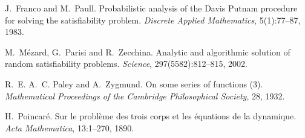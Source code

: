 
J.~Franco and M.~Paull.
\newblock Probabilistic analysis of the Davis Putnam procedure for solving the satisfiability problem.
\newblock \emph{Discrete Applied Mathematics}, 5(1):77--87, 1983.

M.~M\'ezard, G.~Parisi and R.~Zecchina.
\newblock Analytic and algorithmic solution of random satisfiability problems.
\newblock \emph{Science}, 297(5582):812--815, 2002.

R.~E. A.~C. Paley and A.~Zygmund.
\newblock On some series of functions (3).
\newblock \emph{Mathematical Proceedings of the Cambridge Philosophical Society}, 28, 1932.

H.~Poincar\'e.
\newblock Sur le probl\`eme des trois corps et les \'equations de la dynamique.
\newblock \emph{Acta Mathematica}, 13:1--270, 1890.

